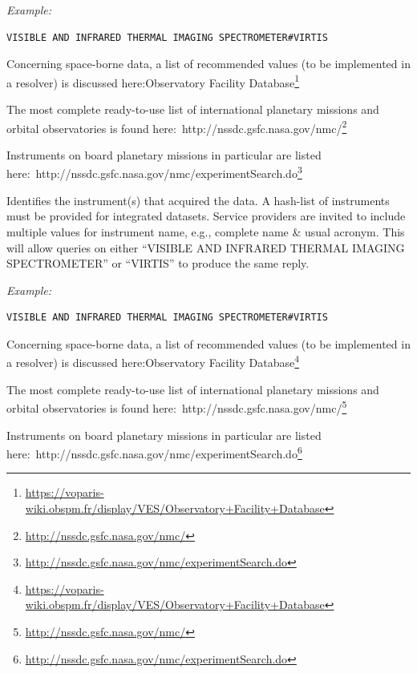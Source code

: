 \documentclass[11pt,a4paper]{ivoa}
\begin{document}
\emph{\emph{Example:}}






\begin{verbatim}
VISIBLE AND INFRARED THERMAL IMAGING SPECTROMETER#VIRTIS
\end{verbatim}




Concerning space-borne data, a list of recommended values (to be implemented in a resolver) is discussed here:Observatory Facility Database\footnote{\url{https://voparis-wiki.obspm.fr/display/VES/Observatory+Facility+Database}}

The most complete ready-to-use list of international planetary missions and orbital observatories is found here: http://nssdc.gsfc.nasa.gov/nmc/\footnote{\url{http://nssdc.gsfc.nasa.gov/nmc/}}

Instruments on board planetary missions in particular are listed here: http://nssdc.gsfc.nasa.gov/nmc/experimentSearch.do\footnote{\url{http://nssdc.gsfc.nasa.gov/nmc/experimentSearch.do}}

Identifies the instrument(s) that acquired the data. A hash-list of instruments must be provided for integrated datasets. Service providers are invited to include multiple values for instrument name, e.g., complete name \& usual acronym. This will allow queries on either ``VISIBLE AND INFRARED THERMAL IMAGING SPECTROMETER'' or ``VIRTIS'' to produce the same reply. 

\emph{\emph{Example:}}






\begin{verbatim}
VISIBLE AND INFRARED THERMAL IMAGING SPECTROMETER#VIRTIS
\end{verbatim}




Concerning space-borne data, a list of recommended values (to be implemented in a resolver) is discussed here:Observatory Facility Database\footnote{\url{https://voparis-wiki.obspm.fr/display/VES/Observatory+Facility+Database}}

The most complete ready-to-use list of international planetary missions and orbital observatories is found here: http://nssdc.gsfc.nasa.gov/nmc/\footnote{\url{http://nssdc.gsfc.nasa.gov/nmc/}}

Instruments on board planetary missions in particular are listed here: http://nssdc.gsfc.nasa.gov/nmc/experimentSearch.do\footnote{\url{http://nssdc.gsfc.nasa.gov/nmc/experimentSearch.do}}
\end{document}
